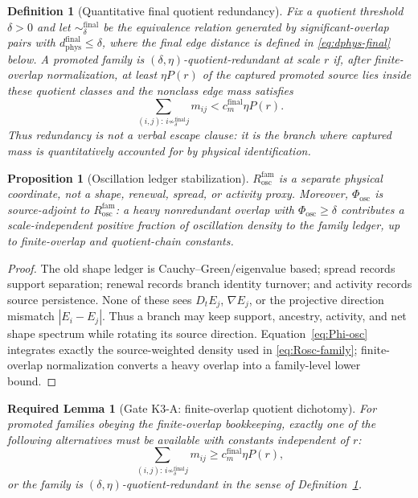 \documentclass[11pt]{article}
\newtheorem{definition}{Definition}
\newtheorem{requiredlemma}{Required Lemma}
\newtheorem{proposition}{Proposition}
\begin{document}
\begin{definition}[Quantitative final quotient redundancy]
\label{def:quant-final-redundancy}
Fix a quotient threshold \(\delta>0\) and let
\(\sim_\delta^{\mathrm{final}}\) be the equivalence relation generated by
significant-overlap pairs with
\(d_{\mathrm{phys}}^{\mathrm{final}}\le\delta\), where the final edge distance
is defined in \eqref{eq:dphys-final} below.  A promoted family is
\((\delta,\eta)\)-quotient-redundant at scale \(r\) if, after finite-overlap
normalization, at least \(\eta P(r)\) of the captured promoted source lies
inside these quotient classes and the nonclass edge mass satisfies
\[
\sum_{(i,j):\,i\not\sim_\delta^{\mathrm{final}}j}m_{ij}
<c_m^{\mathrm{final}}\eta P(r).
\]
Thus redundancy is not a verbal escape clause: it is the branch where captured
mass is quantitatively accounted for by physical identification.
\end{definition}

\begin{proposition}[Oscillation ledger stabilization]
\label{prop:osc-stabilization}
\(R_{\mathrm{osc}}^{\mathrm{fam}}\) is a separate physical coordinate, not a
shape, renewal, spread, or activity proxy.  Moreover, \(\Phi_{\mathrm{osc}}\)
is source-adjoint to \(R_{\mathrm{osc}}^{\mathrm{fam}}\): a heavy
nonredundant overlap with \(\Phi_{\mathrm{osc}}\ge\delta\) contributes a
scale-independent positive fraction of oscillation density to the family
ledger, up to finite-overlap and quotient-chain constants.
\end{proposition}

\begin{proof}
The old shape ledger is Cauchy--Green/eigenvalue based; spread records support
separation; renewal records branch identity turnover; and activity records
source persistence.  None of these sees \(D_tE_j\), \(\nabla E_j\), or the
projective direction mismatch \(|E_i-E_j|\).  Thus a branch may keep support,
ancestry, activity, and net shape spectrum while rotating its source direction.
Equation~\eqref{eq:Phi-osc} integrates exactly the source-weighted density used
in \eqref{eq:Rosc-family}; finite-overlap normalization converts a heavy
overlap into a family-level lower bound.
\end{proof}

\begin{requiredlemma}[Gate K3-A: finite-overlap quotient dichotomy]
\label{lem:K3-dichotomy}
For promoted families obeying the finite-overlap bookkeeping, exactly one of
the following alternatives must be available with constants independent of
\(r\):
\[
\sum_{(i,j):\,i\not\sim_\delta^{\mathrm{final}}j}m_{ij}
\ge c_m^{\mathrm{final}}\eta P(r),
\]
or the family is \((\delta,\eta)\)-quotient-redundant in the sense of
Definition~\ref{def:quant-final-redundancy}.
\end{requiredlemma}
\end{document}
